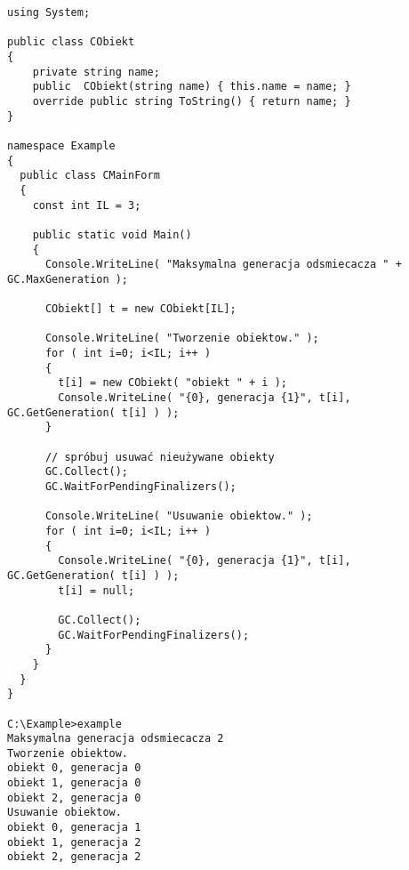 \begin{scriptsize}
\begin{verbatim}
using System;

public class CObiekt 
{
    private string name;
    public  CObiekt(string name) { this.name = name; }
    override public string ToString() { return name; }
}

namespace Example
{
  public class CMainForm
  {  
    const int IL = 3;
 
    public static void Main()
    {    
      Console.WriteLine( "Maksymalna generacja odsmiecacza " + GC.MaxGeneration );
      
      CObiekt[] t = new CObiekt[IL];

      Console.WriteLine( "Tworzenie obiektow." );
      for ( int i=0; i<IL; i++ )
      {     
        t[i] = new CObiekt( "obiekt " + i );
        Console.WriteLine( "{0}, generacja {1}", t[i], GC.GetGeneration( t[i] ) );
      } 

      // spróbuj usuwać nieużywane obiekty
      GC.Collect();
      GC.WaitForPendingFinalizers(); 

      Console.WriteLine( "Usuwanie obiektow." );
      for ( int i=0; i<IL; i++ )
      {
        Console.WriteLine( "{0}, generacja {1}", t[i], GC.GetGeneration( t[i] ) );
        t[i] = null;

        GC.Collect();
        GC.WaitForPendingFinalizers(); 
      }       
    }
  }
}

C:\Example>example
Maksymalna generacja odsmiecacza 2
Tworzenie obiektow.
obiekt 0, generacja 0
obiekt 1, generacja 0
obiekt 2, generacja 0
Usuwanie obiektow.
obiekt 0, generacja 1
obiekt 1, generacja 2
obiekt 2, generacja 2
\end{verbatim}
\end{scriptsize}
